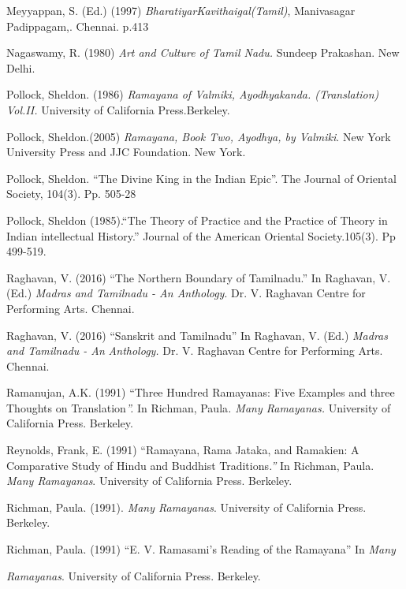 \begin{thebibliography}{99}
  Meyyappan, S. (Ed.) (1997) \textit{BharatiyarKavithaigal(Tamil)}, Manivasagar Padippagam,. Chennai. p.413

  Nagaswamy, R. (1980) \textit{Art and Culture of Tamil Nadu.} Sundeep Prakashan. New Delhi.

  Pollock, Sheldon. (1986) \textit{Ramayana of Valmiki, Ayodhyakanda. (Translation) Vol.II.} University of California Press.Berkeley.

  Pollock, Sheldon.(2005) \textit{Ramayana, Book Two, Ayodhya, by Valmiki}. New York University Press and JJC Foundation. New York.

  Pollock, Sheldon. “The Divine King in the Indian Epic”. The Journal of Oriental Society, 104(3). Pp. 505-28

  Pollock, Sheldon (1985).“The Theory of Practice and the Practice of Theory in Indian intellectual History.” Journal of the American Oriental Society.105(3). Pp 499-519.

  Raghavan, V. (2016) “The Northern Boundary of Tamilnadu.” In Raghavan, V. (Ed.) \textit{Madras and Tamilnadu - An Anthology}. Dr. V. Raghavan Centre for Performing Arts. Chennai.

  Raghavan, V. (2016) “Sanskrit and Tamilnadu” In Raghavan, V. (Ed.) \textit{Madras and Tamilnadu - An} \textit{Anthology.} Dr. V. Raghavan Centre for Performing Arts. Chennai.

  Ramanujan, A.K. (1991) “Three Hundred Ramayanas: Five Examples and three Thoughts on Translation\textit{”.} In Richman, Paula\textit{. Many Ramayanas.} University of California Press. Berkeley.

  Reynolds, Frank, E. (1991) “Ramayana, Rama Jataka, and Ramakien: A Comparative Study of Hindu and Buddhist Traditions\textit{.”} In Richman, Paula.\textit{ Many Ramayanas}. University of California Press. Berkeley.

  Richman, Paula. (1991). \textit{Many Ramayanas}. University of California Press. Berkeley.

  Richman, Paula. (1991) “E. V. Ramasami's Reading of the Ramayana” In \textit{Many}

  \textit{Ramayanas}. University of California Press. Berkeley.


\end{thebibliography}
